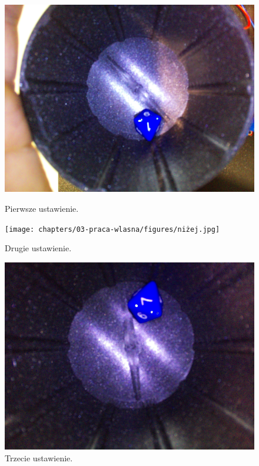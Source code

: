 \begin{figure}[h]
    \centering
    \begin{minipage}{0.32\textwidth}
        \centering
        \includegraphics[width=\linewidth]{chapters/03-praca-wlasna/figures/wysoko.jpg}
        \caption{\label{fig:wysoko}Pierwsze ustawienie.}
    \end{minipage}
    \hfill
    \begin{minipage}{0.32\textwidth}
        \centering
        \texttt{[image: chapters/03-praca-wlasna/figures/niżej.jpg]}
        \caption{\label{fig:nizej}Drugie ustawienie.}
    \end{minipage}
    \hfill
    \begin{minipage}{0.32\textwidth}
        \centering
        \includegraphics[width=\linewidth]{chapters/03-praca-wlasna/figures/ideolo.jpg}
        \caption{\label{fig:ideolo}Trzecie ustawienie.}
    \end{minipage}
\end{figure}

